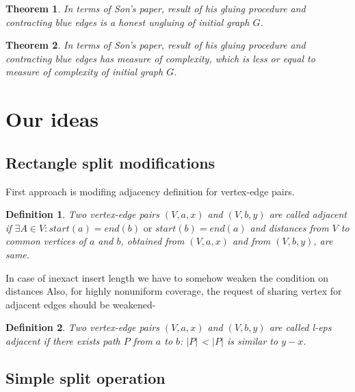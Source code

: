 \documentclass[12pt,a4paper,oneside]{article}
\newtheorem{theorem}{Theorem}
\newtheorem{definition}{Definition}
\begin{document}
\begin{theorem}
  In terms of Son's paper, result of his gluing procedure and contracting blue edges is a honest ungluing of initial graph $G$. 
\end{theorem}
\begin{theorem}
  In terms of Son's paper, result of his gluing procedure and contracting blue edges has measure of complexity, which is less or equal to measure of complexity of initial graph $G$. 
\end{theorem}






\section{Our ideas}
\subsection{Rectangle split modifications}
First approach is modifing adjacency definition for vertex-edge pairs.
\begin{definition}
 Two vertex-edge pairs $(V,a,x)$ and $(V,b,y)$ are called \emph{adjacent} if $\exists A \in V: start (a) = end(b)\text{ or } start(b) = end (a)$ and distances from $V$ to common vertices of $a$ and $b$, obtained from $(V,a,x)$ and from $(V,b,y)$, are same. 
\end{definition}

In case of inexact insert length we have to somehow weaken the condition on distances 
Also, for highly nonuniform coverage, the request of sharing vertex for adjacent edges should be weakened- 

\begin{definition}
 Two vertex-edge pairs $(V,a,x)$ and $(V,b,y)$ are called \emph{l-eps adjacent} if there exists path $P$ from $a$ to $b$: $|P|$ < $|P|$ is similar to $y-x$. 
\end{definition}

  
\subsection{Simple split operation}
\end{document}

